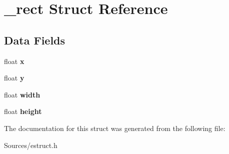\hypertarget{struct__rect}{\section{\-\_\-rect Struct Reference}
\label{struct__rect}
}
\subsection*{Data Fields}
\begin{DoxyCompactItemize}
\item 
\hypertarget{struct__rect_ad0da36b2558901e21e7a30f6c227a45e}{float {\bfseries x}}\label{struct__rect_ad0da36b2558901e21e7a30f6c227a45e}

\item 
\hypertarget{struct__rect_aa4f0d3eebc3c443f9be81bf48561a217}{float {\bfseries y}}\label{struct__rect_aa4f0d3eebc3c443f9be81bf48561a217}

\item 
\hypertarget{struct__rect_ae426f00e82704fa09578f5446e22d915}{float {\bfseries width}}\label{struct__rect_ae426f00e82704fa09578f5446e22d915}

\item 
\hypertarget{struct__rect_a48083b65ac9a863566dc3e3fff09a5b4}{float {\bfseries height}}\label{struct__rect_a48083b65ac9a863566dc3e3fff09a5b4}

\end{DoxyCompactItemize}


The documentation for this struct was generated from the following file\-:\begin{DoxyCompactItemize}
\item 
Sources/estruct.\-h\end{DoxyCompactItemize}
